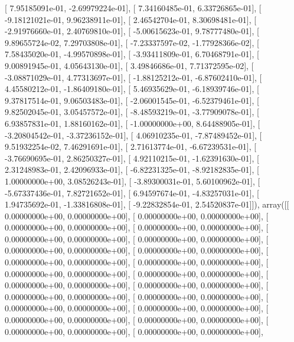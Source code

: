 \documentclass{article}
\begin{document}
       [  7.95185091e-01,  -2.69979224e-01],
       [  7.34160485e-01,   6.33726865e-01],
       [ -9.18121021e-01,   9.96238911e-01],
       [  2.46542704e-01,   8.30698481e-01],
       [ -2.91976660e-01,   2.40769810e-01],
       [ -5.00615623e-01,   9.78777480e-01],
       [  9.89655724e-02,   7.29703808e-01],
       [ -7.23337597e-02,  -1.77928366e-02],
       [  7.58435020e-01,  -4.99570898e-01],
       [ -3.93411809e-01,   6.70468791e-01],
       [  9.00891945e-01,   4.05643130e-01],
       [  3.49846686e-01,   7.71372595e-02],
       [ -3.08871029e-01,   4.77313697e-01],
       [ -1.88125212e-01,  -6.87602410e-01],
       [  4.45580212e-01,  -1.86409180e-01],
       [  5.46935629e-01,  -6.18939746e-01],
       [  9.37817514e-01,   9.06503483e-01],
       [ -2.06001545e-01,  -6.52379461e-01],
       [  9.82502045e-01,   3.05457572e-01],
       [ -8.48593219e-01,  -3.77909078e-01],
       [  6.93857831e-01,   1.88160162e-01],
       [ -1.00000000e+00,   8.64488905e-01],
       [ -3.20804542e-01,  -3.37236152e-01],
       [  4.06910235e-01,  -7.87489452e-01],
       [  9.51932254e-02,   7.46291691e-01],
       [  2.71613774e-01,  -6.67239531e-01],
       [ -3.76690695e-01,   2.86250327e-01],
       [  4.92110215e-01,  -1.62391630e-01],
       [  2.31248983e-01,   2.42096933e-01],
       [ -6.82231325e-01,  -8.92182835e-01],
       [  1.00000000e+00,   3.08526243e-01],
       [ -3.89300031e-01,   5.60100962e-01],
       [ -5.67337436e-01,   7.82721652e-01],
       [  6.94597674e-01,  -4.83257031e-01],
       [  1.94735692e-01,  -1.33816808e-01],
       [ -9.22832854e-01,   2.54520837e-01]]), array([[  0.00000000e+00,   0.00000000e+00],
       [  0.00000000e+00,   0.00000000e+00],
       [  0.00000000e+00,   0.00000000e+00],
       [  0.00000000e+00,   0.00000000e+00],
       [  0.00000000e+00,   0.00000000e+00],
       [  0.00000000e+00,   0.00000000e+00],
       [  0.00000000e+00,   0.00000000e+00],
       [  0.00000000e+00,   0.00000000e+00],
       [  0.00000000e+00,   0.00000000e+00],
       [  0.00000000e+00,   0.00000000e+00],
       [  0.00000000e+00,   0.00000000e+00],
       [  0.00000000e+00,   0.00000000e+00],
       [  0.00000000e+00,   0.00000000e+00],
       [  0.00000000e+00,   0.00000000e+00],
       [  0.00000000e+00,   0.00000000e+00],
       [  0.00000000e+00,   0.00000000e+00],
       [  0.00000000e+00,   0.00000000e+00],
       [  0.00000000e+00,   0.00000000e+00],
       [  0.00000000e+00,   0.00000000e+00],
       [  0.00000000e+00,   0.00000000e+00],
       [  0.00000000e+00,   0.00000000e+00],
       [  0.00000000e+00,   0.00000000e+00],
\end{document}
